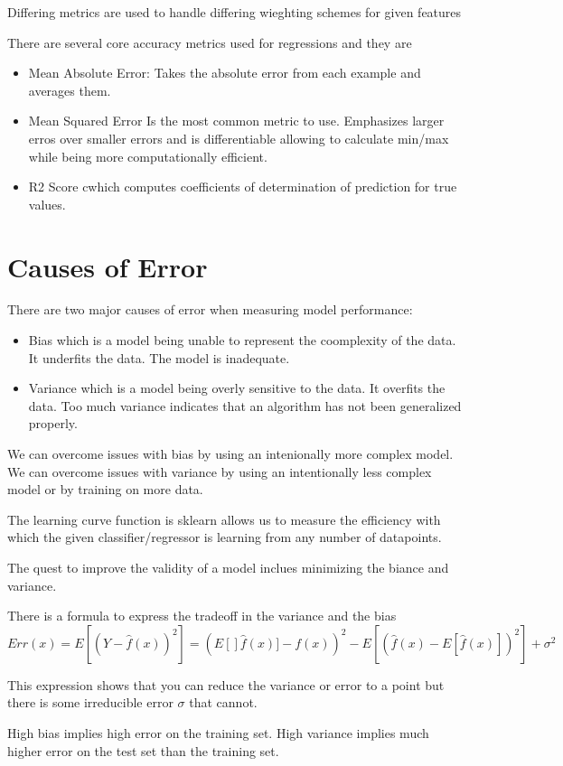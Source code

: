 \documentclass{article}
\begin{document}
Differing metrics are used to handle differing wieghting schemes for given
features

There are several core accuracy metrics used for regressions and they are
\begin{itemize}
\item Mean Absolute Error: Takes the absolute error from each example and
averages them.
\item Mean Squared Error Is the most common metric to use. Emphasizes larger
erros over smaller errors and is differentiable allowing to calculate min/max
while being more computationally efficient.
\item R2 Score cwhich computes coefficients of determination of prediction for
true values.
\end{itemize}

\section{Causes of Error}
There are two major causes of error when measuring model performance:
\begin{itemize}
\item Bias which is a model being unable to represent the coomplexity of the
data. It underfits the data. The model is inadequate.
\item  Variance which is a model being overly sensitive to the data. It overfits
the data. Too much variance indicates that an algorithm has not been
generalized properly.
\end{itemize}

We can overcome issues with bias by using an intenionally more complex model. We
can overcome issues with variance by using an intentionally less complex model
or by training on more data.

The learning curve function is sklearn allows us to measure the efficiency with
which the given classifier/regressor is learning from any number of datapoints.

The quest to improve the validity of a model inclues minimizing the biance and
variance.

There is a formula to express the tradeoff in the variance and the bias
$$Err(x) = E[(Y - \hat{f}(x))^2] = (E[]\hat{f}(x)] - f(x))^2 -
E[(\hat{f}(x) - E[\hat{f}(x)])^2] + \sigma^2$$

This expression shows that you can reduce the variance or error to a point but
there is some irreducible error $\sigma$ that cannot.

High bias implies high error on the training set. High variance implies much
higher error on the test set than the training set.
\end{document}
